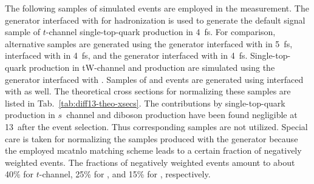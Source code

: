 The following samples of simulated events are employed in the measurement. The \MGAMC generator interfaced with  for hadronization is used to generate the default signal sample of $t$-channel single-top-quark production in 4~\gls{fs}. For comparison, alternative samples are generated using the \MGAMC generator interfaced with  in 5~\gls{fs}, \MGAMC interfaced with \HERWIG in 4~\gls{fs}, and the \POWHEG generator interfaced with \PYTHIA in 4~\gls{fs}. Single-top-quark production in tW-channel and \ttbar production are simulated using the \POWHEG generator interfaced with . Samples of \wjets and \zjets events are generated using \MGAMC interfaced with  as well. The theoretical cross sections for normalizing these samples are listed in Tab.~\ref{tab:diff13-theo-xsecs}. The contributions by single-top-quark production in $s$~channel and diboson production have been found negligible at 13~\TeV after the event selection. Thus corresponding samples are not utilized. Special care is taken for normalizing the samples produced with the \MGAMC generator because the employed \gls{mcatnlo} matching scheme leads to a certain fraction of negatively weighted events. The fractions of negatively weighted events amount to about 40\% for $t$-channel, 25\% for \zjets, and 15\% for \wjets, respectively.


